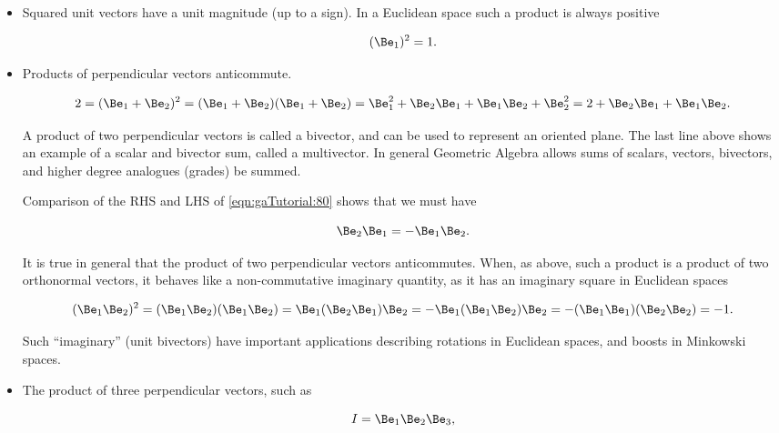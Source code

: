 \begin{itemize}
\item Squared unit vectors have a unit magnitude (up to a sign).  In a Euclidean space such a product is always positive

\begin{dmath}\label{eqn:gaTutorial:60}
(\Be_1)^2 = 1.
\end{dmath}

\item Products of perpendicular vectors anticommute.

\begin{dmath}\label{eqn:gaTutorial:80}
2 
=
(\Be_1 + \Be_2)^2 
= (\Be_1 + \Be_2)(\Be_1 + \Be_2)
= \Be_1^2 + \Be_2 \Be_1 + \Be_1 \Be_2 + \Be_2^2
= 2 + \Be_2 \Be_1 + \Be_1 \Be_2.
\end{dmath}

A product of two perpendicular vectors is called a bivector, and can be used to represent an oriented plane.  The last line above shows an example of a scalar and bivector sum, called a multivector.  In general Geometric Algebra allows sums of scalars, vectors, bivectors, and higher degree analogues (grades) be summed.

Comparison of the RHS and LHS of \cref{eqn:gaTutorial:80} shows that we must have

\begin{dmath}\label{eqn:gaTutorial:100}
\Be_2 \Be_1 = -\Be_1 \Be_2.
\end{dmath}

It is true in general that the product of two perpendicular vectors anticommutes.  When, as above, such a product is a product of
two orthonormal vectors, it behaves like a non-commutative imaginary quantity, as it has an imaginary square in Euclidean spaces

\begin{dmath}\label{eqn:gaTutorial:120}
(\Be_1 \Be_2)^2
=
(\Be_1 \Be_2)
(\Be_1 \Be_2)
=
\Be_1 (\Be_2
\Be_1) \Be_2
=
-\Be_1 (\Be_1
\Be_2) \Be_2
=
-(\Be_1 \Be_1)
(\Be_2 \Be_2)
=-1.
\end{dmath}

Such ``imaginary'' (unit bivectors) have important applications describing rotations in Euclidean spaces, and boosts in Minkowski spaces.

\item
The product of three perpendicular vectors, such as

\begin{dmath}\label{eqn:gaTutorial:140}
I = \Be_1 \Be_2 \Be_3,
\end{dmath}


\end{itemize}
